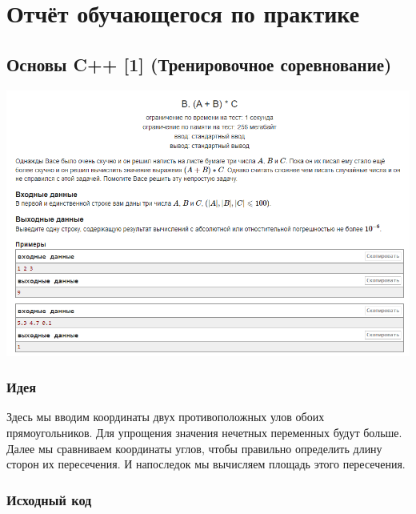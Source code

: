 %
%

\section{Отчёт обучающегося по практике}

\subsection*{Основы C++ [1] (Тренировочное соревнование)}
\begin{center} 
\includegraphics[scale=0.75]{statements/1_B.png}
\end{center} 
\subsubsection*{Идея}
Здесь мы вводим координаты двух противоположных улов обоих прямоугольников. Для упрощения значения нечетных переменных будут больше. Далее мы сравниваем координаты углов, чтобы правильно определить длину сторон их пересечения. И напоследок мы вычисляем площадь этого пересечения.

\subsubsection*{Исходный код}


